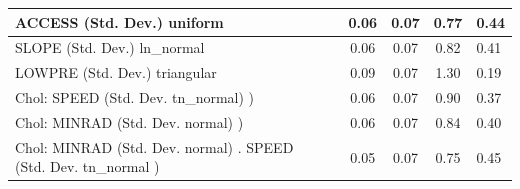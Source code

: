\begin{table}
\begin{center}
\begin{tabular}{|l|l|c|c|c|l|}
			\hline
			ACCESS (Std. Dev.) uniform &  & 0.06 & 0.07 & 0.77 & 0.44 \\
			\hline
			SLOPE (Std. Dev.) ln_normal &  & 0.06 & 0.07 & 0.82 & 0.41 \\
			\hline
			LOWPRE (Std. Dev.) triangular &  & 0.09 & 0.07 & 1.30 & 0.19 \\
			\hline
			 Chol: SPEED (Std. Dev. tn_normal) ) &  & 0.06 & 0.07 & 0.90 & 0.37 \\
			\hline
			 Chol: MINRAD (Std. Dev. normal) ) &  & 0.06 & 0.07 & 0.84 & 0.40 \\
			\hline
			 Chol: MINRAD (Std. Dev. normal) . SPEED (Std. Dev.   tn_normal ) &  & 0.05 & 0.07 & 0.75 & 0.45 \\
			\hline
		\end{tabular}
	\end{center}
\end{table}
